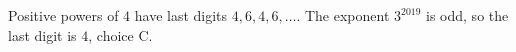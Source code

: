 Positive powers of $4$ have last digits $4,6,4,6,\ldots$. The exponent $3^{2019}$ is odd, so the last digit is $\boxed4$, choice $\boxed{\text{C}}$.
